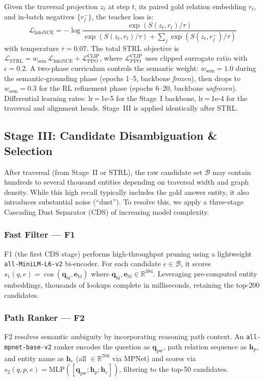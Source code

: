 \documentclass[10pt,conference]{IEEEtran}
\begin{document}
Given the traversal projection $z_t$ at step $t$, its paired gold relation embedding $r_t$, and in-batch negatives $\{r_j^-\}$, the teacher loss is:
\begin{equation}
\mathcal{L}_{\text{InfoNCE}} = -\log \frac{\exp(S(z_t,r_t)/\tau)}{\exp(S(z_t,r_t)/\tau) + \sum_j \exp(S(z_t,r_j^-)/\tau)}
\end{equation}
with temperature $\tau=0.07$. The total STRL objective is $\mathcal{L}_{\text{STRL}} = w_{\text{sem}}\,\mathcal{L}_{\text{InfoNCE}} + \mathcal{L}^{\text{CLIP}}_{\text{PPO}}$, where $\mathcal{L}^{\text{CLIP}}_{\text{PPO}}$ uses clipped surrogate ratio with $\epsilon=0.2$. A two-phase curriculum controls the semantic weight: $w_{\text{sem}} = 1.0$ during the semantic-grounding phase (epochs 1--5, backbone \emph{frozen}), then drops to $w_{\text{sem}} = 0.3$ for the RL refinement phase (epochs 6--20, backbone \emph{unfrozen}). Differential learning rates: lr\,=\,1e-5 for the Stage~I backbone, lr\,=\,1e-4 for the traversal and alignment heads. Stage~III is applied identically after STRL.

\subsection{Stage III: Candidate Disambiguation \& Selection}

After traversal (from Stage~II or STRL), the raw candidate set $\mathcal{B}$ may contain hundreds to several thousand entities depending on traversal width and graph density. While this high recall typically includes the gold answer entity, it also introduces substantial noise (``dust''). To resolve this, we apply a three-stage Cascading Dust Separator (CDS) of increasing model complexity.

\subsubsection{Fast Filter — F1}
F1 (the first CDS stage) performs high-throughput pruning using a lightweight \texttt{all-MiniLM-L6-v2} bi-encoder. For each candidate $e \in \mathcal{B}$, it scores $s_1(q, e) = \cos(\mathbf{q}_{\text{bi}}, \mathbf{e}_{\text{bi}})$ where $\mathbf{q}_{\text{bi}}, \mathbf{e}_{\text{bi}} \in \mathbb{R}^{384}$. Leveraging pre-computed entity embeddings, thousands of lookups complete in milliseconds, retaining the top-200 candidates.

\subsubsection{Path Ranker — F2}
F2 resolves semantic ambiguity by incorporating reasoning path context. An \texttt{all-mpnet-base-v2} ranker encodes the question as $\mathbf{q}_{\text{pw}}$, path relation sequence as $\mathbf{h}_p$, and entity name as $\mathbf{h}_e$ (all $\in \mathbb{R}^{768}$ via MPNet) and scores via $s_2(q, p, e) = \text{MLP}([\mathbf{q}_{\text{pw}}; \mathbf{h}_p; \mathbf{h}_e])$, filtering to the top-50 candidates.
\end{document}
